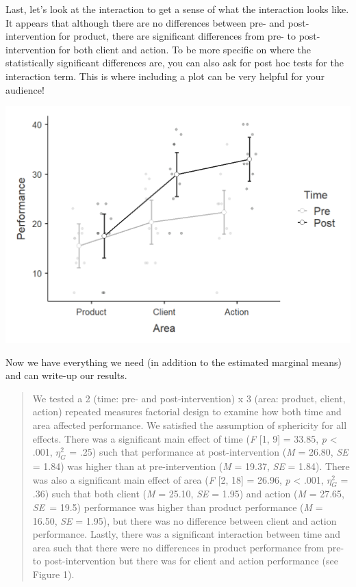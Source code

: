 \documentclass[
]{book}
\begin{document}
Last, let's look at the interaction to get a sense of what the interaction looks like. It appears that although there are no differences between pre- and post-intervention for product, there are significant differences from pre- to post-intervention for both client and action. To be more specific on where the statistically significant differences are, you can also ask for post hoc tests for the interaction term. This is where including a plot can be very helpful for your audience!

\includegraphics{images/06-factorial-anova/rm-factorial_interaction.png}

Now we have everything we need (in addition to the estimated marginal means) and can write-up our results.

\begin{quote}
We tested a 2 (time: pre- and post-intervention) x 3 (area: product, client, action) repeated measures factorial design to examine how both time and area affected performance. We satisfied the assumption of sphericity for all effects. There was a significant main effect of time (\emph{F} {[}1, 9{]} = 33.85, \emph{p} \textless{} .001, \(\eta^2_G\) = .25) such that performance at post-intervention (\emph{M} = 26.80, \emph{SE} = 1.84) was higher than at pre-intervention (\emph{M} = 19.37, \emph{SE} = 1.84). There was also a significant main effect of area (\emph{F} {[}2, 18{]} = 26.96, \emph{p} \textless{} .001, \(\eta^2_G\) = .36) such that both client (\emph{M} = 25.10, \emph{SE} = 1.95) and action (\emph{M} = 27.65, \emph{SE}~= 19.5) performance was higher than product performance (\emph{M} = 16.50, \emph{SE} = 1.95), but there was no difference between client and action performance. Lastly, there was a significant interaction between time and area such that there were no differences in product performance from pre- to post-intervention but there was for client and action performance (see Figure 1).
\end{quote}
\end{document}
